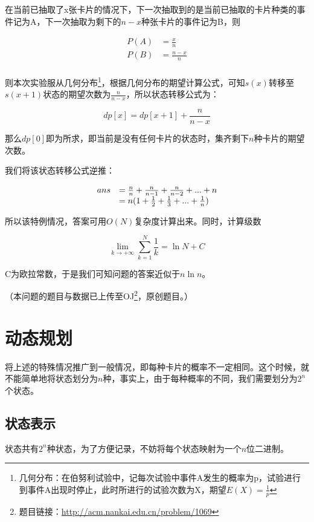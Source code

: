 \documentclass[master]{thesis-uestc}
\begin{document}
在当前已抽取了x张卡片的情况下，下一次抽取到的是当前已抽取的卡片种类的事件记为A，下一次抽取为剩下的$n-x$种张卡片的事件记为B，则

$$
\begin{array}{lll}

P(A) & = \frac{x}{n} \\
P(B) & = \frac{n-x}{n} \\

\end{array}
$$

则本次实验服从几何分布\footnote{几何分布：在伯努利试验中，记每次试验中事件A发生的概率为p，试验进行到事件A出现时停止，此时所进行的试验次数为X，期望$E(X)=\frac{1}{p}$}，根据几何分布的期望计算公式，可知$s(x)$转移至$s(x+1)$状态的期望次数为$\frac{n}{n-x}$，所以状态转移公式为：

$$
dp[x]=dp[x+1]+\frac{n}{n-x}
$$

那么$dp[0]$即为所求，即当前是没有任何卡片的状态时，集齐剩下$n$种卡片的期望次数。

我们将该状态转移公式逆推：

$$
\begin{array}{lll}
ans&=\frac{n}{n}+\frac{n}{n-1}+\frac{n}{n-2}+...+n\\
&=n\*(1+\frac{1}{2}+\frac{1}{3}+...+\frac{1}{n})
\end{array}
$$

所以该特例情况，答案可用$O(N)$复杂度计算出来。同时，计算级数

$$
\lim_{k \to +\infty}\sum\limits_{k=1}^{N}{\frac{1}{k}}=\ln{N}+C
$$

C为欧拉常数，于是我们可知问题的答案近似于$n\ln{n}$。

（本问题的题目与数据已上传至OJ\footnote{题目链接：\url{http://acm.nankai.edu.cn/problem/1069} }，原创题目。）

\section{动态规划}


将上述的特殊情况推广到一般情况，即每种卡片的概率不一定相同。这个时候，就不能简单地将状态划分为$n$种，事实上，由于每种概率的不同，我们需要划分为$2^n$个状态。

\subsection{状态表示}

状态共有$2^n$种状态，为了方便记录，不妨将每个状态映射为一个$n$位二进制。
\end{document}
